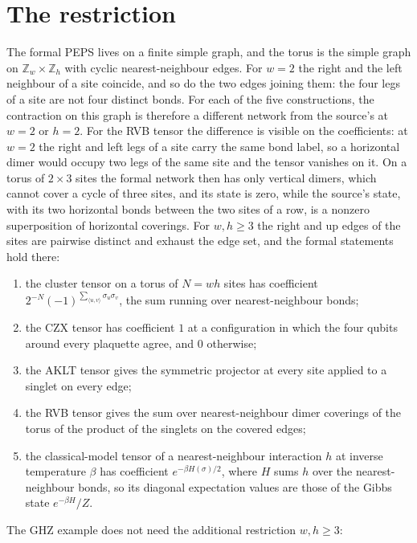 \documentclass{article}
\begin{document}
\section{The restriction}
The formal PEPS lives on a finite simple graph, and the torus is the simple
graph on $\mathbb Z_{w}\times\mathbb Z_{h}$ with cyclic nearest-neighbour
edges. For $w=2$ the right and the left neighbour of a site coincide, and so
do the two edges joining them: the four legs of a site are not four distinct
bonds. For each of the five constructions, the contraction on this graph is
therefore a different network from the source's at $w=2$ or $h=2$. For the RVB tensor
the difference is visible on the coefficients: at $w=2$ the right and left
legs of a site carry the same bond label, so a horizontal dimer would occupy
two legs of the same site and the tensor vanishes on it. On a torus of
$2\times 3$ sites the formal network then has only vertical dimers, which
cannot cover a cycle of three sites, and its state is zero, while the
source's state, with its two horizontal bonds between the two sites of a
row, is a nonzero superposition of horizontal coverings. For
$w,h\ge 3$ the right and up edges of the sites are pairwise distinct and
exhaust the edge set, and the formal statements hold there:
\begin{enumerate}
    \item the cluster tensor on a torus of $N=wh$ sites has coefficient
          $2^{-N}(-1)^{\sum_{\langle u,v\rangle}\sigma_u\sigma_v}$, the sum running
          over nearest-neighbour bonds;
    \item the CZX tensor has coefficient $1$ at a configuration in which the
          four qubits around every plaquette agree, and $0$ otherwise;
    \item the AKLT tensor gives the symmetric projector at every site
          applied to a singlet on every edge;
    \item the RVB tensor gives the sum over nearest-neighbour dimer
          coverings of the torus of the product of the singlets on the covered
          edges;
    \item the classical-model tensor of a nearest-neighbour interaction $h$
          at inverse temperature $\beta$ has coefficient $e^{-\beta H(\sigma)/2}$,
          where $H$ sums $h$ over the nearest-neighbour bonds, so its diagonal
          expectation values are those of the Gibbs state $e^{-\beta H}/Z$.
\end{enumerate}
The GHZ example does not need the additional restriction $w,h\ge3$:
\end{document}
